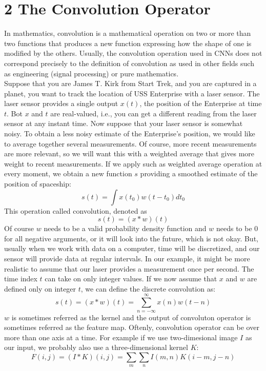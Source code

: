 \documentclass[11pt]{article}
\begin{document}
\section{2 The Convolution Operator}
\hspace*{1cm} In mathematics, convolution is a mathematical operation on two or more than two functions that produces a new function expressing how the shape of one is modified by the others. Usually, the convolution operation used in CNNs does not correspond precisely to the definition of convolution as used in other fields such as engineering (signal processing) or pure mathematics.\\
Suppose that you are James T. Kirk from Start Trek, and you are captured in a planet, you want to track the location of USS Enterprise with a laser sensor. The laser sensor provides a single output $x(t)$, the position of the Enterprise at time $t$. Bot $x$ and $t$ are real-valued, i.e., you can get a different reading from the laser sensor at any instant time. Now suppose that your laser sensor is somewhat noisy. To obtain a less noisy estimate of the Enterprise's position, we would like to average together several measurements. Of course, more recent measurements are more relevant, so we will want this with a weighted average that gives more weight to recent measurements. If we apply such as weighted average operation at every moment, we obtain a new function $s$ providing a smoothed estimate of the position of spaceship:
$$ s(t) = \int x(t_0)w(t-t_0)dt_0$$
This operation called convolution, denoted as 
$$s(t) = (x \ast w)(t)$$
Of course $w$ needs to be a valid probability density function and $w$ needs to be 0 for all negative arguments, or it will look into the future, which is not okay. But, usually when we work with data on a computer, time will be discretized, and our sensor will provide data at regular intervals. In our example, it might be more realistic to assume that our laser provides a measurement once per second. The time index $t$ can take on only integer values. If we now assume that $x$ and $w$ are defined only on integer $t$, we can define the discrete convolution as:
$$s(t) = (x \ast w)(t) = \sum_{n= -\infty}^{\infty} x(n)w(t-n)$$
$w$ is sometimes referred as the kernel and the output of convoluton operator is sometimes referred as the feature map.
Oftenly, convolution operator can be over more than one axis at a time. For example if we use two-dimesional image $I$ as our input, we probably also use a three-dimensional kernel $K$:
$$F(i,j) = (I \ast K)(i,j)=\sum_{m}\sum_{n} I(m,n)K(i-m,j-n)$$
\end{document}
